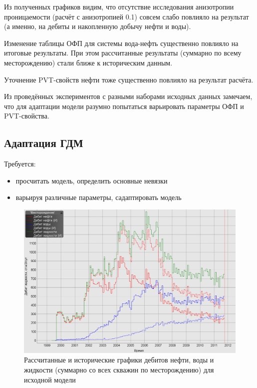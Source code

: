 \documentclass[a4paper,12pt]{article}
\begin{document}
Из полученных графиков видим, что отсутствие исследования анизотропии проницаемости (расчёт с анизотропией 0.1) совсем слабо повлияло на результат (а именно, на дебиты и накопленную добычу нефти и воды).

Изменение таблицы ОФП для системы вода-нефть существенно повлияло на итоговые результаты.
При этом рассчитанные результаты (суммарно по всему месторождению) стали ближе к историческим данным.

Уточнение PVT-свойств нефти тоже существенно повлияло на результат расчёта.

Из проведённых экспериментов с разными наборами исходных данных замечаем, что для адаптации модели разумно попытаться варьировать параметры ОФП и PVT-свойства.
\newpage

\subsection{Адаптация ГДМ}

Требуется:

\begin{itemize}
	\item просчитать модель, определить основные невязки
	\item варьируя различные параметры, садаптировать модель
\end{itemize}

\begin{figure}[H]
\center
\includegraphics[width=\textwidth]{model_not_adapt}
\caption{Рассчитанные и исторические графики дебитов нефти, воды и жидкости (суммарно со всех скважин по месторождению) для исходной модели}
\label{fig:history_before_adaptation}
\end{figure}
\end{document}
